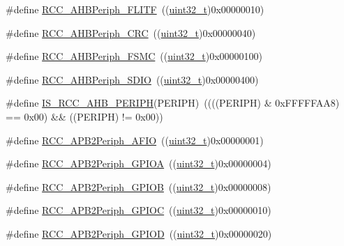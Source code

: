 \begin{DoxyCompactItemize}
\item 
\#define \hyperlink{group___a_h_b__peripheral_ga4277d70aa6b5e0b1ec6c8fb8180aac08}{R\+C\+C\+\_\+\+A\+H\+B\+Periph\+\_\+\+F\+L\+I\+TF}~((\hyperlink{_p_e___types_8h_a33594304e786b158f3fb30289278f5af}{uint32\+\_\+t})0x00000010)
\item 
\#define \hyperlink{group___a_h_b__peripheral_gaef0cd08bcf96323324f328675ccd5ac3}{R\+C\+C\+\_\+\+A\+H\+B\+Periph\+\_\+\+C\+RC}~((\hyperlink{_p_e___types_8h_a33594304e786b158f3fb30289278f5af}{uint32\+\_\+t})0x00000040)
\item 
\#define \hyperlink{group___a_h_b__peripheral_ga857dbf7044a974efb142c4450eafd609}{R\+C\+C\+\_\+\+A\+H\+B\+Periph\+\_\+\+F\+S\+MC}~((\hyperlink{_p_e___types_8h_a33594304e786b158f3fb30289278f5af}{uint32\+\_\+t})0x00000100)
\item 
\#define \hyperlink{group___a_h_b__peripheral_gaa2664a55eedcedff22532982ae753566}{R\+C\+C\+\_\+\+A\+H\+B\+Periph\+\_\+\+S\+D\+IO}~((\hyperlink{_p_e___types_8h_a33594304e786b158f3fb30289278f5af}{uint32\+\_\+t})0x00000400)
\item 
\#define \hyperlink{group___a_h_b__peripheral_ga5fbf97a9c9f5742c94cde6ffe389aedc}{I\+S\+\_\+\+R\+C\+C\+\_\+\+A\+H\+B\+\_\+\+P\+E\+R\+I\+PH}(P\+E\+R\+I\+PH)~((((P\+E\+R\+I\+PH) \& 0x\+F\+F\+F\+F\+F\+A\+A8) == 0x00) \&\& ((\+P\+E\+R\+I\+P\+H) != 0x00))
\item 
\#define \hyperlink{group___a_p_b2__peripheral_ga5aa9469879ffa019d4836b0d297104c5}{R\+C\+C\+\_\+\+A\+P\+B2\+Periph\+\_\+\+A\+F\+IO}~((\hyperlink{_p_e___types_8h_a33594304e786b158f3fb30289278f5af}{uint32\+\_\+t})0x00000001)
\item 
\#define \hyperlink{group___a_p_b2__peripheral_ga44b92fbf2e288796b1acbce2708f3636}{R\+C\+C\+\_\+\+A\+P\+B2\+Periph\+\_\+\+G\+P\+I\+OA}~((\hyperlink{_p_e___types_8h_a33594304e786b158f3fb30289278f5af}{uint32\+\_\+t})0x00000004)
\item 
\#define \hyperlink{group___a_p_b2__peripheral_ga8c8909c3640508e9ce31dff80010a6dd}{R\+C\+C\+\_\+\+A\+P\+B2\+Periph\+\_\+\+G\+P\+I\+OB}~((\hyperlink{_p_e___types_8h_a33594304e786b158f3fb30289278f5af}{uint32\+\_\+t})0x00000008)
\item 
\#define \hyperlink{group___a_p_b2__peripheral_gaf1f4b467becee1ff31ba2c54328a0115}{R\+C\+C\+\_\+\+A\+P\+B2\+Periph\+\_\+\+G\+P\+I\+OC}~((\hyperlink{_p_e___types_8h_a33594304e786b158f3fb30289278f5af}{uint32\+\_\+t})0x00000010)
\item 
\#define \hyperlink{group___a_p_b2__peripheral_ga177200a365084af306e98389edeba42b}{R\+C\+C\+\_\+\+A\+P\+B2\+Periph\+\_\+\+G\+P\+I\+OD}~((\hyperlink{_p_e___types_8h_a33594304e786b158f3fb30289278f5af}{uint32\+\_\+t})0x00000020)

\end{DoxyCompactItemize}
